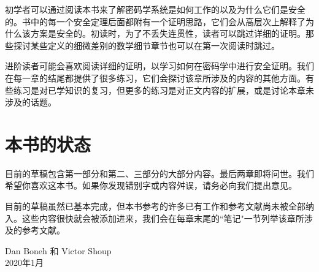 初学者可以通过阅读本书来了解密码学系统是如何工作的以及为什么它们是安全的。书中的每一个安全定理后面都附有一个证明思路，它们会从高层次上解释了为什么该方案是安全的。初读时，为了不丢失连贯性，读者可以跳过详细的证明。那些探讨某些定义的细微差别的数学细节章节也可以在第一次阅读时跳过。

进阶读者可能会喜欢阅读详细的证明，以学习如何在密码学中进行安全证明。我们在每一章的结尾都提供了很多练习，它们会探讨该章所涉及的内容的其他方面。有些练习是对已学知识的复习，但更多的练习是对正文内容的扩展，或是讨论本章未涉及的话题。

\section*{本书的状态}

目前的草稿包含第一部分和第二、三部分的大部分内容。最后两章即将问世。我们希望你喜欢这本书。如果你发现错别字或内容舛误，请务必向我们提出意见。

\begin{snote}[引用。]
目前的草稿虽然已基本完成，但本书参考的许多已有工作和参考文献尚未被全部纳入。这些内容很快就会被添加进来，我们会在每章末尾的``笔记"一节列举该章所涉及的参考文献。
\end{snote}

\vspace{50pt}

\noindent Dan Boneh 和 Victor Shoup\\
\noindent 2020年1月